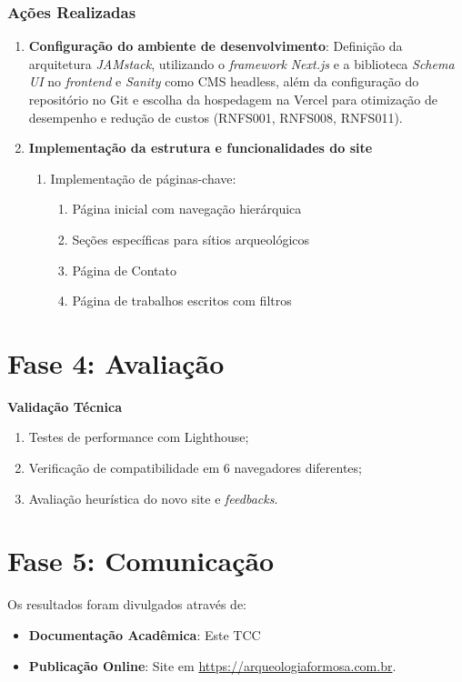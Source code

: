 \subsubsection*{Ações Realizadas}
\begin{enumerate}
\item \textbf{Configuração do ambiente de desenvolvimento}: Definição da arquitetura \textit{JAMstack}, utilizando o \textit{framework} \textit{Next.js} e a biblioteca \textit{Schema UI} no \textit{frontend} e \textit{Sanity} como CMS headless, além da configuração do repositório no Git e escolha da hospedagem na Vercel para otimização de desempenho e redução de custos (RNFS001, RNFS008, RNFS011).

    
    \item \textbf{Implementação da estrutura e funcionalidades do site}
    \begin{enumerate}
        \item Implementação de páginas-chave:
        \begin{enumerate}
            \item Página inicial com navegação hierárquica
            \item Seções específicas para sítios arqueológicos
            \item Página de Contato
            \item Página de trabalhos escritos com filtros
        \end{enumerate}
    \end{enumerate}
    
\end{enumerate}

\section{Fase 4: Avaliação} \label{sec:avaliacao-dsr}

    \textbf{Validação Técnica}
    \begin{enumerate}
        \item Testes de performance com Lighthouse;
        \item Verificação de compatibilidade em 6 navegadores diferentes;
        \item Avaliação heurística do novo site e \textit{feedbacks}.
    \end{enumerate}
    

\section{Fase 5: Comunicação} \label{sec:comunicacao-dsr}

Os resultados foram divulgados através de:
\begin{itemize}
    \item \textbf{Documentação Acadêmica}: Este TCC
    \item \textbf{Publicação Online}: Site em \url{https://arqueologiaformosa.com.br}.
\end{itemize}


